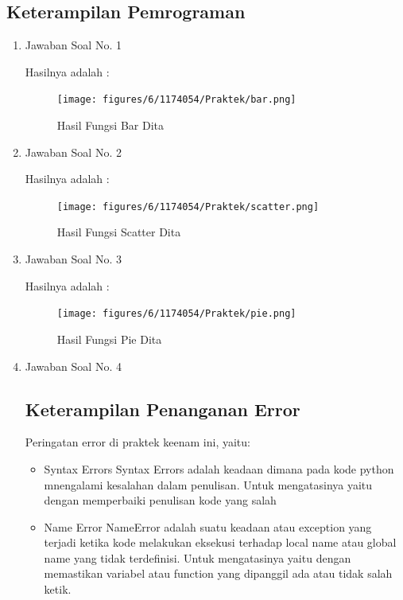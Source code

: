\subsection{Keterampilan Pemrograman}
\begin{enumerate}

\item Jawaban Soal No. 1

Hasilnya adalah : 
\begin{figure}[H]
	\texttt{[image: figures/6/1174054/Praktek/bar.png]}
	\centering
	\caption{Hasil Fungsi Bar Dita}
\end{figure}

\item Jawaban Soal No. 2

Hasilnya adalah : 
\begin{figure}[H]
	\texttt{[image: figures/6/1174054/Praktek/scatter.png]}
	\centering
	\caption{Hasil Fungsi Scatter Dita}
\end{figure}

\item Jawaban Soal No. 3

Hasilnya adalah : 
\begin{figure}[H]
	\texttt{[image: figures/6/1174054/Praktek/pie.png]}
	\centering
	\caption{Hasil Fungsi Pie Dita}
\end{figure}

\item Jawaban Soal No. 4


\subsection{Keterampilan Penanganan Error}

Peringatan error di praktek keenam ini, yaitu:
\begin{itemize}
\item Syntax Errors
Syntax Errors adalah keadaan dimana pada kode python mnengalami kesalahan dalam penulisan. Untuk mengatasinya yaitu dengan memperbaiki penulisan kode yang salah 

\item Name Error
NameError adalah suatu keadaan atau exception yang terjadi ketika kode melakukan eksekusi terhadap local name atau global name yang tidak terdefinisi. Untuk mengatasinya yaitu dengan memastikan variabel atau function yang dipanggil ada atau tidak salah ketik.


\end{itemize}
\end{enumerate}
